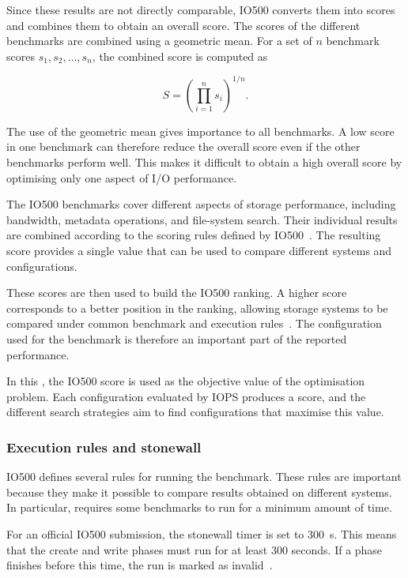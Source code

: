 Since these results are not directly comparable, IO500 converts them into
scores and combines them to obtain an overall score. The scores of the
different benchmarks are combined using a geometric mean. For a set of
$n$ benchmark scores $s_1, s_2, \ldots, s_n$, the combined score is
computed as

\begin{equation}
S =
\left(
\prod_{i=1}^{n} s_i
\right)^{1/n}.
\end{equation}

The use of the geometric mean gives importance to all benchmarks. A low
score in one benchmark can therefore reduce the overall score even if the
other benchmarks perform well. This makes it difficult to obtain a high
overall score by optimising only one aspect of I/O performance.

The IO500 benchmarks cover different aspects of storage performance,
including bandwidth, metadata operations, and file-system search. Their
individual results are combined according to the scoring rules defined by
IO500~\cite{io500rules}. The resulting score provides a single value that
can be used to compare different systems and configurations.

These scores are then used to build the IO500 ranking. A higher score
corresponds to a better position in the ranking, allowing storage systems
to be compared under common benchmark and execution rules~\cite{io500list}.
The configuration used for the benchmark is therefore an important part
of the reported performance.

In this , the IO500 score is used as the objective value of the
optimisation problem. Each configuration evaluated by IOPS produces a
score, and the different search strategies aim to find configurations
that maximise this value.


\subsubsection{Execution rules and stonewall}

IO500 defines several rules for running the benchmark. These rules are
important because they make it possible to compare results obtained on
different systems. In particular,  requires some benchmarks to run for a minimum amount of time.

For an official IO500 submission, the stonewall timer is set to
\SI{300}{\second}. This means that the create and write phases must run
for at least 300 seconds. If a phase finishes before this time, the run
is marked as invalid~\cite{io500rules}.

